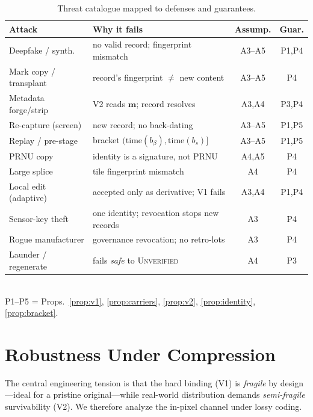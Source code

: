 \documentclass[journal]{IEEEtran}
\begin{document}
\fi
\begin{table}[t]
\centering
\caption{Threat catalogue mapped to defenses and guarantees.}
\label{tab:threats}
\renewcommand{\arraystretch}{1.2}
\setlength{\tabcolsep}{3pt}
\footnotesize
\begin{tabular}{@{}p{2.3cm}p{3.0cm}cc@{}}
\toprule
\textbf{Attack} & \textbf{Why it fails} & \textbf{Assump.} & \textbf{Guar.} \\
\midrule
Deepfake / synth.  & no valid record; fingerprint mismatch & A3--A5 & P1,P4 \\
Mark copy / transplant & record's fingerprint $\neq$ new content & A3--A5 & P4 \\
Metadata forge/strip & V2 reads $\mathbf{m}$; record resolves & A3,A4 & P3,P4 \\
Re-capture (screen) & new record; no back-dating & A3--A5 & P1,P5 \\
Replay / pre-stage & bracket $(\mathrm{time}(b_\beta),\mathrm{time}(b_s)]$ & A3--A5 & P1,P5 \\
PRNU copy~\cite{goljan2011defending} & identity is a signature, not PRNU & A4,A5 & P4 \\
Large splice       & tile fingerprint mismatch & A4 & P4 \\
Local edit (adaptive) & accepted only as derivative; V1 fails & A3,A4 & P1,P4 \\
Sensor-key theft   & one identity; revocation stops new records & A3 & P4 \\
Rogue manufacturer & governance revocation; no retro-lots & A3 & P4 \\
Launder / regenerate & fails \emph{safe} to \textsc{Unverified} & A4 & P3 \\
\bottomrule
\end{tabular}
\\[2pt]
P1--P5 = Props.~\ref{prop:v1}, \ref{prop:carriers}, \ref{prop:v2},
\ref{prop:identity}, \ref{prop:bracket}.
\end{table}

\section{Robustness Under Compression}\label{sec:compression}

The central engineering tension is that the hard binding (V1) is \emph{fragile}
by design---ideal for a pristine original---while real-world distribution
demands \emph{semi-fragile} survivability (V2). We therefore analyze the in-pixel
channel under lossy coding.
\end{document}
